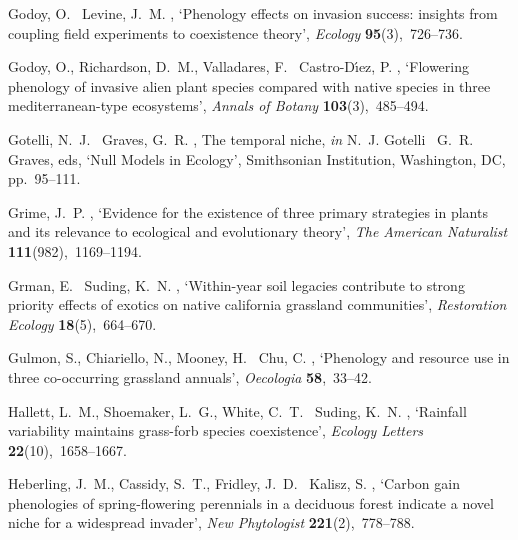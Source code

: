 \documentclass[11pt]{article}
\begin{document}
\begin{thebibliography}{xx}
Godoy, O. \harvardand\ Levine, J.~M.  \harvardyearright ,
  `Phenology effects on invasion success: insights from coupling field
  experiments to coexistence theory', {\em Ecology} {\bf 95}(3),~726--736.

Godoy, O., Richardson, D.~M., Valladares, F. \harvardand\ Castro-D{\'\i}ez, P.
  \harvardyearleft 2009\harvardyearright , `Flowering phenology of invasive
  alien plant species compared with native species in three mediterranean-type
  ecosystems', {\em Annals of Botany} {\bf 103}(3),~485--494.

Gotelli, N.~J. \harvardand\ Graves, G.~R.  \harvardyearright , The temporal niche, {\em in} N.~J. Gotelli
  \harvardand\ G.~R. Graves, eds, `Null Models in Ecology', Smithsonian
  Institution, Washington, DC, pp.~95--111.

Grime, J.~P.  \harvardyearright , `Evidence for the
  existence of three primary strategies in plants and its relevance to
  ecological and evolutionary theory', {\em The American Naturalist} {\bf
  111}(982),~1169--1194.

Grman, E. \harvardand\ Suding, K.~N.  \harvardyearright ,
  `Within-year soil legacies contribute to strong priority effects of exotics
  on native california grassland communities', {\em Restoration Ecology} {\bf
  18}(5),~664--670.

Gulmon, S., Chiariello, N., Mooney, H. \harvardand\ Chu, C.  \harvardyearleft
  1983\harvardyearright , `Phenology and resource use in three co-occurring
  grassland annuals', {\em Oecologia} {\bf 58},~33--42.

Hallett, L.~M., Shoemaker, L.~G., White, C.~T. \harvardand\ Suding, K.~N.
  \harvardyearleft 2019\harvardyearright , `Rainfall variability maintains
  grass-forb species coexistence', {\em Ecology Letters} {\bf
  22}(10),~1658--1667.

Heberling, J.~M., Cassidy, S.~T., Fridley, J.~D. \harvardand\ Kalisz, S.
  \harvardyearright , `Carbon gain phenologies of
  spring-flowering perennials in a deciduous forest indicate a novel niche for
  a widespread invader', {\em New Phytologist} {\bf 221}(2),~778--788.


\end{thebibliography}
\end{document}
